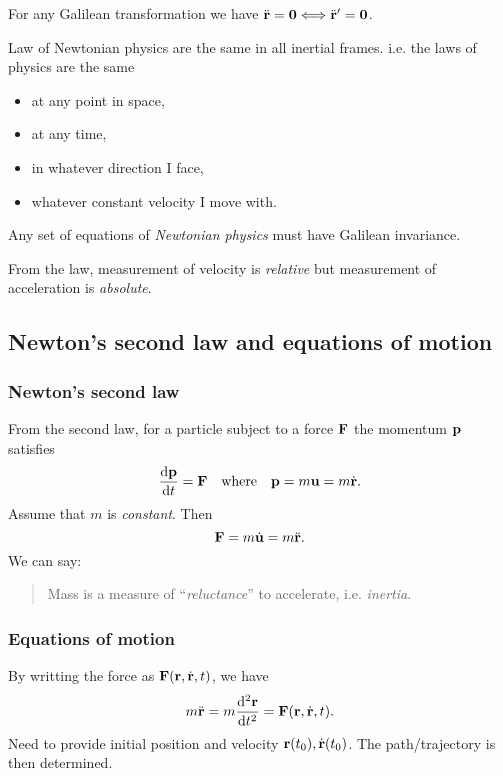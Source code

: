 \begin{note}
    For any Galilean transformation we have $ \ddot{{\bf r}}=\mathbf{0} \Longleftrightarrow \ddot{{\bf r}}'=\mathbf{0} $.
\end{note}

\begin{law}
    Law of Newtonian physics are the same in all inertial frames. i.e. the laws of physics are the same
    \begin{itemize}
        \item at any point in space,
        \item at any time,
        \item in whatever direction I face,
        \item whatever constant velocity I move with.
    \end{itemize}
    Any set of equations of \textit{Newtonian physics} must have Galilean invariance.
\end{law}

\begin{note}
    From the law, measurement of velocity is \textit{relative} but measurement of acceleration is \textit{absolute}.
\end{note}

\subsection{Newton's second law and equations of motion}
\subsubsection*{Newton's second law}

From the second law, for a particle subject to a force ${\bf F}$ the momentum ${\bf p}$ satisfies
\[
    \frac{\mathrm{d}{\bf p}}{\mathrm{d}t} = {\bf F} \quad \text{where}\quad {\bf p}=m{\bf u}=m \dot{{\bf r}}. 
\]
Assume that $m$ is \textit{constant}. Then 
\[
    {\bf F} = m \dot{{\bf u}} = m \ddot{{\bf r}}.
\]
We can say: 
\begin{quote}
    Mass is a measure of ``\textit{reluctance}'' to accelerate, i.e. \textit{inertia}.
\end{quote}

\subsubsection*{Equations of motion}
By writting the force as $ {\bf F}(\mathbf{r},\dot{{\bf r}},t) $, we have 
\[
    m \ddot{{\bf r}} = m \frac{\mathrm{d}^2 {\bf r}}{\mathrm{d}t^2} = {\bf F}({\bf r},\dot{{\bf r}},t). 
\]
Need to provide initial position and velocity $ \mathbf{r}(t_0),\dot{{\bf r}}(t_0) $. The path/trajectory is then determined.

